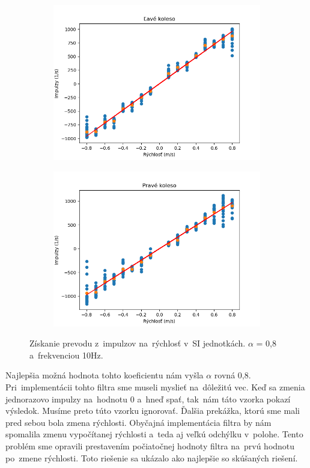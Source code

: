 \begin{figure}[!htbp]
	\begin{subfigure}{0.5\textwidth}
		\includegraphics[width=\textwidth]{img/lw_08100.png}
	\end{subfigure}
	\hfill
	\begin{subfigure}{0.5\textwidth}
		\includegraphics[width=\textwidth]{img/rw_08100.png}
	\end{subfigure}
	\caption{Získanie prevodu z~impulzov na~rýchlosť v~SI jednotkách. $\alpha$ = 0,8 a~frekvenciou 10Hz.}
	\label{fig:rw_lw_08100}
\end{figure}

Najlepšia možná hodnota tohto koeficientu nám vyšla $\alpha$ rovná 0,8. Pri~implementácii tohto filtra sme museli myslieť na~dôležitú vec.
Keď sa zmenia jednorazovo impulzy na~hodnotu 0 a~hneď spať, tak~nám táto vzorka pokazí výsledok. Musíme preto túto vzorku ignorovať. Ďalšia
prekážka, ktorú sme mali pred sebou bola zmena rýchlosti. Obyčajná implementácia filtra by nám spomalila zmenu vypočítanej rýchlosti
a~teda aj veľkú odchýlku v~polohe. Tento problém sme opravili prestavením počiatočnej hodnoty filtra na~prvú hodnotu po~zmene rýchlosti.
Toto riešenie sa ukázalo ako najlepšie so skúšaných riešení.

